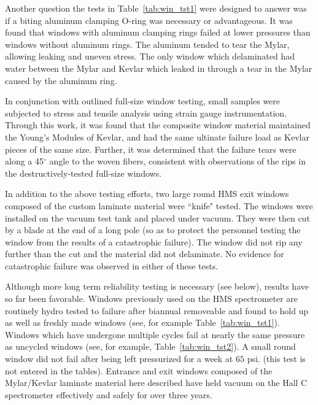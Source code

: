 Another question the tests in Table~\ref{tab:win_tst1} were designed to
answer was if
a biting aluminum clamping O-ring was necessary or advantageous. It was found
that windows with aluminum clamping rings failed at lower pressures than
windows without aluminum rings. The aluminum tended to tear the Mylar, allowing
leaking and uneven stress. The only window which delaminated had water between
the Mylar and Kevlar which leaked in through a tear in the
Mylar caused by the aluminum ring.

In conjunction with outlined full-size window testing, small samples
were subjected to stress and tensile analysis using strain gauge
instrumentation.  Through this work, it was found that the composite
window material maintained the Young's Modules of Kevlar, and had the
same ultinate failure load as Kevlar pieces of the same size.
Further, it was determined that the failure tears were along a
45$^{\circ}$ angle to the woven fibers, consistent with observations
of the rips in the destructively-tested full-size windows.  

In addition to the above testing efforts, two large round HMS exit windows
composed of the custom laminate material were ``knife" tested. The windows
were installed on the vacuum test tank and placed under vacuum. They were then
cut by a blade at the end of a long pole (so as to protect the personnel
testing the window from the results of a catastrophic failure). The window
did not rip any further than the cut and the
material did not delaminate. No evidence for catastrophic failure
was observed in either of these tests.

Although more long term reliability testing is necessary (see below),
results have so far been favorable.
Windows previously used on the HMS spectrometer are routinely hydro
tested to failure after biannual removeable and found to
hold up as well as freshly made windows (see, for example
Table~\ref{tab:win_tst1}).  Windows which have undergone multiple cycles fail at nearly the same pressure as uncycled
windows (see, for example, Table~\ref{tab:win_tst2}). A small round window did not fail after
being left pressurized for
a week at $65$ psi. (this test is not entered in the tables).
Entrance and exit windows composed of the Mylar/Kevlar laminate
material here described have held vacuum on the Hall C
spectrometer effectively and safely for over three years.

